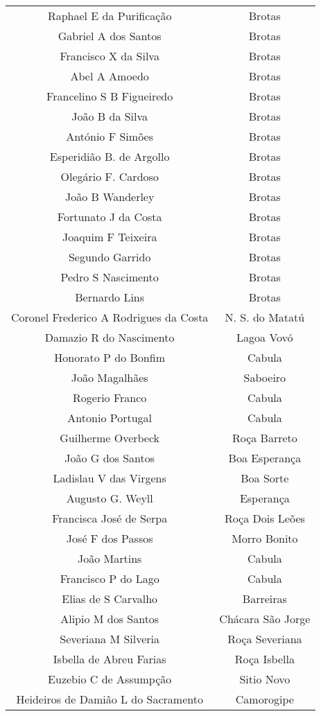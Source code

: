 \begin{tiny}
\begin{longtable}{c|c}
Raphael E da Purificação & Brotas \\
Gabriel A dos Santos & Brotas \\
Francisco X da Silva & Brotas \\
Abel A Amoedo & Brotas \\
Francelino S B Figueiredo & Brotas \\
João B da Silva & Brotas \\
António F Simões & Brotas \\
Esperidião B. de Argollo & Brotas \\
Olegário F. Cardoso & Brotas \\
João B Wanderley & Brotas \\
Fortunato J da Costa & Brotas \\
Joaquim F Teixeira & Brotas \\
Segundo Garrido & Brotas \\
Pedro S Nascimento & Brotas \\
Bernardo Lins & Brotas \\
Coronel Frederico A Rodrigues da Costa & N. S. do Matatú \\
Damazio R do Nascimento & Lagoa Vovó \\
Honorato P do Bonfim & Cabula \\
João Magalhães & Saboeiro \\
Rogerio Franco & Cabula \\
Antonio Portugal & Cabula \\
Guilherme Overbeck & Roça Barreto \\
João G dos Santos & Boa Esperança \\
Ladislau V das Virgens & Boa Sorte \\
Augusto G. Weyll & Esperança \\
Francisca José de Serpa & Roça Dois Leões \\
José F dos Passos & Morro Bonito \\
João Martins & Cabula \\
Francisco P do Lago & Cabula \\
Elias de S Carvalho & Barreiras \\
Alipio M dos Santos & Chácara São Jorge \\
Severiana M Silveria & Roça Severiana \\
Isbella de Abreu Farias & Roça Isbella \\
Euzebio C de Assumpção & Sitio Novo \\
Heideiros de Damião L do Sacramento & Camorogipe \\

\end{longtable}
\end{tiny}

